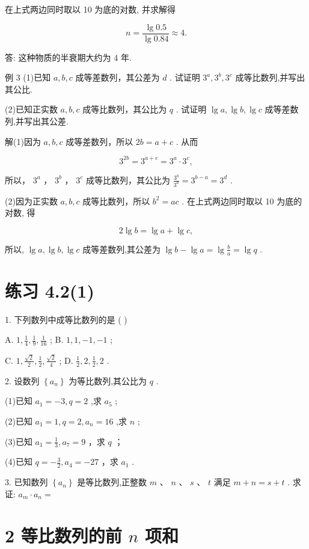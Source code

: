 \documentclass[10pt]{article}
\begin{document}
在上式两边同时取以 10 为底的对数, 并求解得

\[
n = \frac{\lg {0.5}}{\lg {0.84}} \approx  4.
\]

答: 这种物质的半衰期大约为 4 年.

例 3 (1)已知 \(a,b,c\) 成等差数列，其公差为 \(d\) . 试证明 \({3}^{a},{3}^{b},{3}^{c}\) 成等比数列,并写出其公比.

(2)已知正实数 \(a,b,c\) 成等比数列，其公比为 \(q\) . 试证明 \(\lg a,\lg b,\lg c\) 成等差数列,并写出其公差.

解(1)因为 \(a,b,c\) 成等差数列，所以 \({2b} = a + c\) . 从而

\[
{3}^{2b} = {3}^{a + c} = {3}^{a} \cdot  {3}^{c},
\]

所以， \({3}^{a}\) ， \({3}^{b}\) ， \({3}^{c}\) 成等比数列，其公比为 \(\frac{{3}^{b}}{{3}^{a}} = {3}^{b - a} = {3}^{d}\) .

(2)因为正实数 \(a,b,c\) 成等比数列，所以 \({b}^{2} = {ac}\) . 在上式两边同时取以 10 为底的对数, 得

\[
2\lg b = \lg a + \lg c,
\]

所以, \(\lg a,\lg b,\lg c\) 成等差数列,其公差为 \(\lg b - \lg a = \lg \frac{b}{a} = \lg q\) .

\section*{练习 4.2(1)}

1. 下列数列中成等比数列的是 ( )

A. \(1,\frac{1}{4},\frac{1}{9},\frac{1}{16}\) ; B. \(1,1, - 1, - 1\) ;

C. \(1,\frac{\sqrt{2}}{2},\frac{1}{2},\frac{\sqrt{2}}{4}\) ; D. \(\frac{1}{2},2,\frac{1}{2},2\) .

2. 设数列 \(\left\{  {a}_{n}\right\}\) 为等比数列,其公比为 \(q\) .

(1)已知 \({a}_{1} =  - 3,q = 2\) ,求 \({a}_{5}\) ;

(2)已知 \({a}_{1} = 1,q = 2,{a}_{n} = {16}\) ,求 \(n\) ;

(3)已知 \({a}_{1} = \frac{1}{3},{a}_{7} = 9\) ，求 \(q\) ；

(4)已知 \(q =  - \frac{3}{2},{a}_{4} =  - {27}\) ，求 \({a}_{1}\) .

3. 已知数列 \(\left\{  {a}_{n}\right\}\) 是等比数列,正整数 \(m\text{ 、 }n\text{ 、 }s\text{ 、 }t\) 满足 \(m + n = s + t\) . 求证: \({a}_{m} \cdot  {a}_{n} =\)

\section*{2 等比数列的前 \(n\) 项和}
\end{document}
